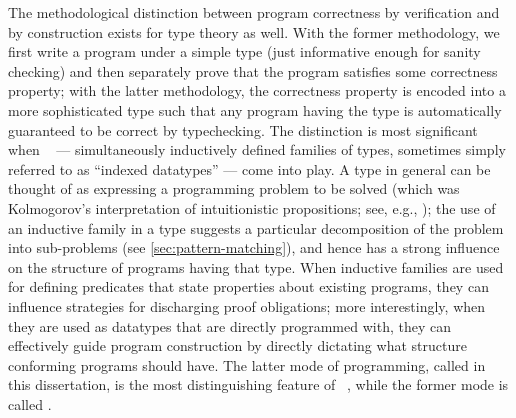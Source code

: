 The methodological distinction between program correctness by verification and by construction exists for type theory as well.
With the former methodology, we first write a program under a simple type (just informative enough for sanity checking) and then separately prove that the program satisfies some correctness property; with the latter methodology, the correctness property is encoded into a more sophisticated type such that any program having the type is automatically guaranteed to be correct by typechecking.
The distinction is most significant when ~\citep{Dybjer-inductive-families} --- simultaneously inductively defined families of types, sometimes simply referred to as ``indexed datatypes'' --- come into play.
A type in general can be thought of as expressing a programming problem to be solved (which was Kolmogorov's interpretation of intuitionistic propositions; see, e.g., \citet{ML-truth-of-a-proposition}); the use of an inductive family in a type suggests a particular decomposition of the problem into sub-problems (see \autoref{sec:pattern-matching}), and hence has a strong influence on the structure of programs having that type.
When inductive families are used for defining predicates that state properties about existing programs, they can influence strategies for discharging proof obligations; more interestingly, when they are used as datatypes that are directly programmed with, they can effectively guide program construction by directly dictating what structure conforming programs should have.
The latter mode of programming, called  in this dissertation, is the most distinguishing feature of ~\citep{McBride-Epigram, McKinna-why-dependent-types-matter}, while the former mode is called .

